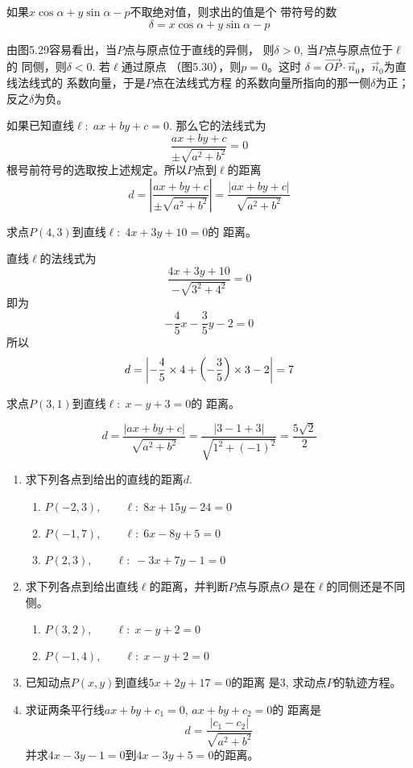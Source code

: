 如果$x\cos\alpha+y\sin\alpha-p$不取绝对值，则求出的值是个
带符号的数
\[\delta=x\cos\alpha+y\sin\alpha-p\]

由图5.29容易看出，当$P$点与原点位于直线的异侧，
则$\delta>0$, 当$P$点与原点位于$\ell$的
同侧，则$\delta <0$. 若$\ell$通过原点
（图5.30），则$p=0$。这时
$\delta=\Vec{OP}\cdot \vec{n}_0$，$\vec{n}_0$为直线法线式的
系数向量，于是$P$点在法线式方程
的系数向量所指向的那一侧$\delta$为正；反之$\delta$为负。

如果已知直线$\ell:\; ax+by+c=0$. 那么它的法线式为
\[\frac{ax+by+c}{\pm\sqrt{a^2+b^2}}=0\]
根号前符号的选取按上述规定。所以$P$点到$\ell$的距离
\[d=\left|\frac{ax+by+c}{\pm\sqrt{a^2+b^2}}\right|=\frac{|ax+by+c|}{\sqrt{a^2+b^2}}\]

\begin{example}
求点$P(4,3)$到直线$\ell:\; 4x+3y+10=0$的
距离。
\end{example}


\begin{solution}
直线$\ell$的法线式为
\[\frac{4x+3y+10}{-\sqrt{3^2+4^2}}=0\]
即为
\[-\frac{4}{5}x-\frac{3}{5}y-2=0\]
所以
\[d=\left|-\dfrac{4}{5}\times4+\left(-\dfrac{3}{5}\right)\times3-2\right|=7\]
\end{solution}

\begin{example}
    求点$P(3,1)$到直线$\ell:\; x-y+3=0$的
距离。
\end{example}

\begin{solution}
    \[d=\frac{|ax+by+c|}{\sqrt{a^2+b^2}}=\frac{|3-1+3|}{\sqrt{1^2+(-1)^2}}=\frac{5\sqrt{2}}{2}\]
\end{solution}

\begin{ex}
\begin{enumerate}
    \item 求下列各点到给出的直线的距离$d$. 
\begin{enumerate}
    \item $P(-2,3),\qquad \ell:\; 8x+15y-24=0$
    \item $P(-1,7),\qquad  \ell:\; 6x-8y+5=0$
 \item $P(2,3),\qquad \ell:\; -3x+7y-1=0$
\end{enumerate}
\item 求下列各点到给出直线$\ell$的距离，并判断$P$点与原点$O$
是在$\ell$的同侧还是不同侧。
\begin{enumerate}
    \item $P(3,2),\qquad \ell:\; x-y+2=0$
    \item $P(-1,4),\qquad \ell:\; x-y+2=0$
\end{enumerate}

\item 已知动点$P(x,y)$到直线$5x+2y+17=0$的距离
是3, 求动点$P$的轨迹方程。
\item 求证两条平行线$ax+by+c_1=0$, $ax+by+c_2=0$的
距离是
\[d=\frac{|c_1-c_2|}{\sqrt{a^2+b^2}}\]
并求$4x-3y-1=0$到$4x-3y+5=0$的距离。
\end{enumerate}
\end{ex}

